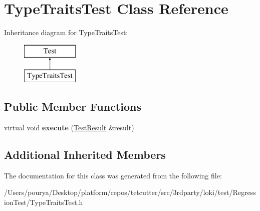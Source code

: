 \hypertarget{classTypeTraitsTest}{}\section{Type\+Traits\+Test Class Reference}
\label{classTypeTraitsTest}
Inheritance diagram for Type\+Traits\+Test\+:\begin{figure}[H]
\begin{center}
\leavevmode
\includegraphics[height=2.000000cm]{classTypeTraitsTest}
\end{center}
\end{figure}
\subsection*{Public Member Functions}
\begin{DoxyCompactItemize}
\item 
\hypertarget{classTypeTraitsTest_a9f462431a00b33d9317486ec1085f06f}{}virtual void {\bfseries execute} (\hyperlink{classTestResult}{Test\+Result} \&result)\label{classTypeTraitsTest_a9f462431a00b33d9317486ec1085f06f}

\end{DoxyCompactItemize}
\subsection*{Additional Inherited Members}


The documentation for this class was generated from the following file\+:\begin{DoxyCompactItemize}
\item 
/\+Users/pourya/\+Desktop/platform/repos/tetcutter/src/3rdparty/loki/test/\+Regression\+Test/Type\+Traits\+Test.\+h\end{DoxyCompactItemize}
